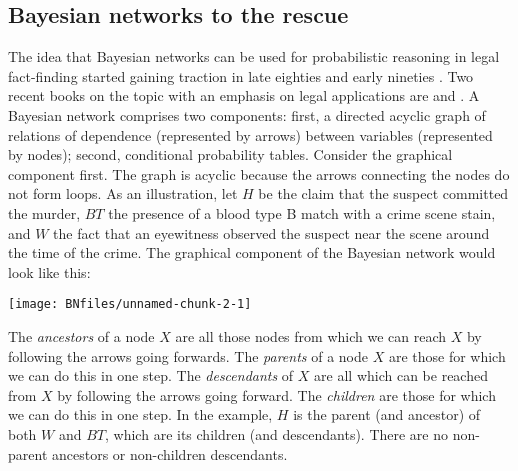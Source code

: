 \documentclass{article}
\begin{document}
 






 



\subsection{Bayesian networks to the rescue}  

The idea that Bayesian networks can be used for probabilistic reasoning in legal fact-finding started gaining traction in late eighties \citep{Friedman1986A-diagrammatic-} and early nineties
\citep{Edwards1991Influence-diagr}. Two recent books on the topic with an emphasis on legal applications are   \citep{Fenton2018Risk} and \citep{taroni2006bayesian}. 
A Bayesian network comprises two components: first, a directed acyclic graph of relations of dependence (represented by arrows) between variables (represented by nodes); second,  conditional probability tables. 
Consider the graphical component first. The graph is acyclic because the arrows connecting the nodes do not form loops. 
As an illustration,  let \(H\) be the claim that the suspect committed the murder, \(BT\) the presence of a blood type B match with a crime scene stain, and \(W\) the fact that an eyewitness observed the suspect near the scene around the time of the crime. The graphical component of the Bayesian network would look like this:
\begin{center}\texttt{[image: BNfiles/unnamed-chunk-2-1]} \end{center}
The \emph{ancestors} of a node \(X\) are all those nodes from
which we can reach \(X\) by following the arrows going forwards. The
\textit{parents} of a node \(X\) are those for which we can do this in one step.
The \textit{descendants} of \(X\) are all which can be reached from \(X\) by
following the arrows going forward. The \textit{children} are those for
which we can do this in one step. In the example,
$H$ is the parent (and ancestor) of both $ W$ and $BT$, which are its children (and descendants). There are no non-parent ancestors or non-children
descendants. %
\end{document}
